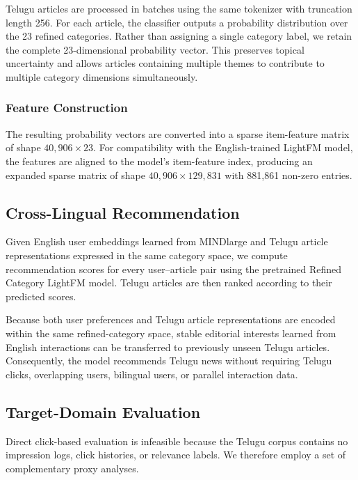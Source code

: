 \documentclass[conference]{IEEEtran}
\begin{document}
Telugu articles are processed in batches using the same tokenizer with truncation length 256. For each article, the classifier outputs a probability distribution over the 23 refined categories. Rather than assigning a single category label, we retain the complete 23-dimensional probability vector. This preserves topical uncertainty and allows articles containing multiple themes to contribute to multiple category dimensions simultaneously.

\subsubsection{Feature Construction}

The resulting probability vectors are converted into a sparse item-feature matrix of shape $40{,}906 \times 23$. For compatibility with the English-trained LightFM model, the features are aligned to the model's item-feature index, producing an expanded sparse matrix of shape $40{,}906 \times 129{,}831$ with 881,861 non-zero entries.

\subsection{Cross-Lingual Recommendation}

Given English user embeddings learned from MINDlarge and Telugu article representations expressed in the same category space, we compute recommendation scores for every user--article pair using the pretrained Refined Category LightFM model. Telugu articles are then ranked according to their predicted scores.

Because both user preferences and Telugu article representations are encoded within the same refined-category space, stable editorial interests learned from English interactions can be transferred to previously unseen Telugu articles. Consequently, the model recommends Telugu news without requiring Telugu clicks, overlapping users, bilingual users, or parallel interaction data.

\subsection{Target-Domain Evaluation}

Direct click-based evaluation is infeasible because the Telugu corpus contains no impression logs, click histories, or relevance labels. We therefore employ a set of complementary proxy analyses.
\end{document}
